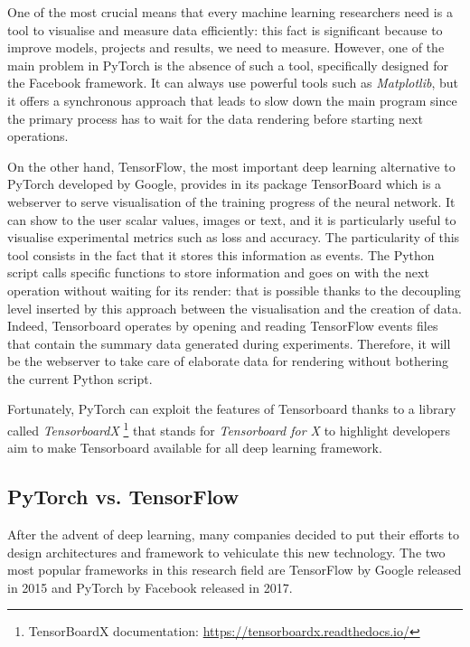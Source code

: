 One of the most crucial means that every machine learning researchers need is a tool to visualise and measure data efficiently: this fact is significant because to improve models, projects and results, we need to measure.
However, one of the main problem in PyTorch is the absence of such a tool, specifically designed for the Facebook framework. It can always use powerful tools such as \textit{Matplotlib}, but it offers a synchronous approach that leads to slow down the main program since the primary process has to wait for the data rendering before starting next operations. 

On the other hand, TensorFlow, the most important deep learning alternative to PyTorch developed by Google, provides in its package TensorBoard which is a webserver to serve visualisation of the training progress of the neural network. It can show to the user scalar values, images or text, and it is particularly useful to visualise experimental metrics such as loss and accuracy. The particularity of this tool consists in the fact that it stores this information as events.
The Python script calls specific functions to store information and goes on with the next operation without waiting for its render: that is possible thanks to the decoupling level inserted by this approach between the visualisation and the creation of data. Indeed, Tensorboard operates by opening and reading  TensorFlow events files that contain the summary data generated during experiments. Therefore, it will be the webserver to take care of elaborate data for rendering without bothering the current Python script.

Fortunately, PyTorch can exploit the features of Tensorboard thanks to a library called \textit{TensorboardX} \footnote{TensorBoardX documentation: \href{https://tensorboardx.readthedocs.io/en/latest/index.html}{https://tensorboardx.readthedocs.io/}} that stands for \textit{Tensorboard for X} to highlight developers aim to make Tensorboard available for all deep learning framework.

\subsection{PyTorch vs. TensorFlow}

After the advent of deep learning, many companies decided to put their efforts to design architectures and framework to vehiculate this new technology. The two most popular frameworks in this research field are TensorFlow \cite{abadi2016tensorflow} by Google released in 2015 and PyTorch \cite{paszke2017automatic}  by Facebook released in 2017.

